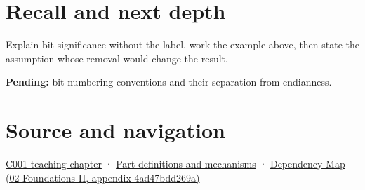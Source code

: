 \section{Recall and next depth}\label{appendix-280445746493-recall-and-next-depth}

Explain bit significance without the label, work the example above, then state the assumption whose removal would change the result.

\textbf{Pending:} bit numbering conventions and their separation from endianness.

\section{Source and navigation}\label{appendix-280445746493-source-and-navigation}

\href{Continuous\%20Notes/Computing\%20Foundations\%20-\%20From\%20Bits\%20to\%20C++\%20and\%20Systems\%20APIs\#From\%20a\%20signal\%20to\%20an\%20interpretation}{C001 teaching chapter} · \hyperref[appendix-fd090d982a15]{Part definitions and mechanisms} · \href{../02-Foundations-II/main.pdf\#nameddest=appendix-4ad47bdd269a}{Dependency Map (02-Foundations-II, appendix-4ad47bdd269a)}
